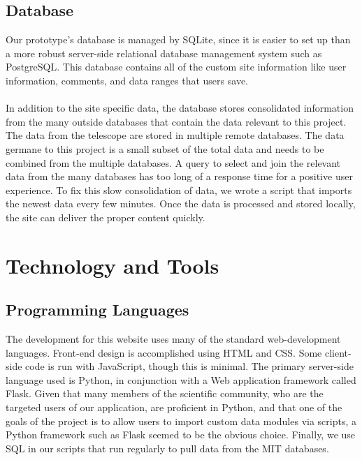 \documentclass[12pt]{article}
\begin{document}
\begin{spacing}{1.5}
\subsection{Database}
Our prototype's database is managed by SQLite, since it is easier to set up than a more robust server-side relational database management system such as PostgreSQL. This database contains all of the custom site information like user information, comments, and data ranges that users save.
\\ \\
In addition to the site specific data, the database stores consolidated information from the many outside databases that contain the data relevant to this project. The data from the telescope are stored in multiple remote databases. The data germane to this project is a small subset of the total data and needs to be combined from the multiple databases. A query to select and join the relevant data from the many databases has too long of a response time for a positive user experience. To fix this slow consolidation of data, we wrote a script that imports the newest data every few minutes. Once the data is processed and stored locally, the site can deliver the proper content quickly.

\section{Technology and Tools}
\subsection{Programming Languages}
The development for this website uses many of the standard web-development languages. Front-end design is accomplished using HTML and CSS. Some client-side code is run with JavaScript, though this is minimal. The primary server-side language used is Python, in conjunction with a Web application framework called Flask.  Given that many members of the scientific community, who are the targeted users of our application, are proficient in Python, and that one of the goals of the project is to allow users to import custom data modules via scripts, a Python framework such as Flask seemed to be the obvious choice.  Finally, we use SQL in our scripts that run regularly to pull data from the MIT databases.


\end{spacing}
\end{document}

